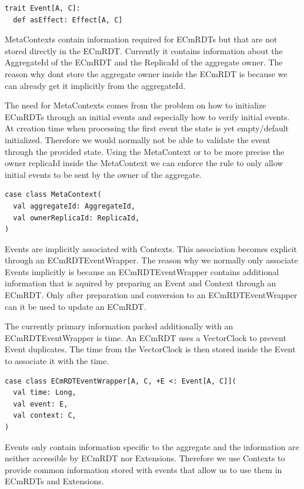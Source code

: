 \documentclass[
	ngerman,
	ruledheaders=section,   %
	class=report,		    %
	thesis={type=bachelor}, %
	accentcolor=9c,			%
	custommargins=true,    %
	marginpar=false,        %
	parskip=half-,          %
	fontsize=11pt,          %
]{tudapub}
\begin{document}
\begin{lstlisting}
trait Event[A, C]:
  def asEffect: Effect[A, C]
\end{lstlisting}

MetaContexts contain information required for ECmRDTs but that are not stored directly in the ECmRDT. Currently it contains information about the AggregateId of the ECmRDT and the ReplicaId of the aggregate owner. The reason why dont store the aggregate owner inside the ECmRDT is because we can already get it implicitly from the aggregateId.

The need for MetaContexts comes from the problem on how to initialize ECmRDTs through an initial events and especially how to verify initial events. At creation time when processing the first event the state is yet empty/default initialized. Therefore we would normally not be able to validate the event through the provided state. Using the MetaContext or to be more precise the owner replicaId inside the MetaContext we can enforce the rule to only allow initial events to be sent by the owner of the aggregate.

\begin{lstlisting}
case class MetaContext(
  val aggregateId: AggregateId,
  val ownerReplicaId: ReplicaId,
)
\end{lstlisting}

Events are implicitly associated with Contexts. This association becomes explicit through an ECmRDTEventWrapper. The reason why we normally only associate Events implicitly is because an ECmRDTEventWrapper contains additional information that is aquired by preparing an Event and Context through an ECmRDT. Only after preparation and conversion to an ECmRDTEventWrapper can it be used to update an ECmRDT. 

The currently primary information packed additionally with an ECmRDTEventWrapper is time. An ECmRDT uses a VectorClock to prevent Event duplicates. The time from the VectorClock is then stored inside the Event to associate it with the time.

\begin{lstlisting}
case class ECmRDTEventWrapper[A, C, +E <: Event[A, C]](
  val time: Long,
  val event: E,
  val context: C,
)
\end{lstlisting}

Events only contain information specific to the aggregate and the information are neither accessible by ECmRDT nor Extensions. Therefore we use Contexts to provide common information stored with events that allow us to use them in ECmRDTs and Extensions. 
\end{document}

